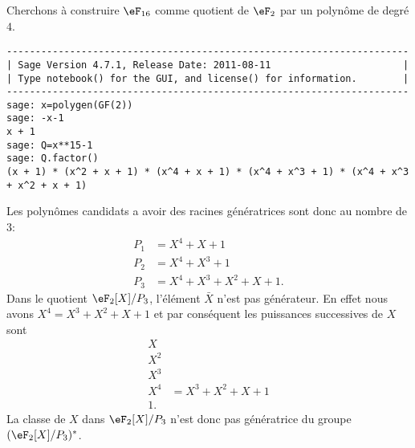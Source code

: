 \begin{example}     \label{ExemWUdrcs}
    Cherchons à construire \( \eF_{16}\) comme quotient de \( \eF_2\) par un polynôme de degré \( 4\).
    \begin{verbatim}
----------------------------------------------------------------------
| Sage Version 4.7.1, Release Date: 2011-08-11                       |
| Type notebook() for the GUI, and license() for information.        |
----------------------------------------------------------------------
sage: x=polygen(GF(2))
sage: -x-1
x + 1
sage: Q=x**15-1
sage: Q.factor()
(x + 1) * (x^2 + x + 1) * (x^4 + x + 1) * (x^4 + x^3 + 1) * (x^4 + x^3 + x^2 + x + 1)
    \end{verbatim}
    Les polynômes candidats a avoir des racines génératrices sont donc au nombre de \( 3\):
    \begin{subequations}
        \begin{align}
            P_1&=X^4+X+1\\
            P_2&=X^4+X^3+1\\
            P_3&=X^4+X^3+X^2+X+1.
        \end{align}
    \end{subequations}
    Dans le quotient \( \eF_2[X]/P_3\), l'élément \( \bar X\) n'est pas générateur. En effet nous avons \( X^4=X^3+X^2+X+1\) et par conséquent les puissances successives de \( X\) sont
    \begin{subequations}
        \begin{align}
            X&\\
            X^2&\\
            X^3&\\
            X^4&=X^3+X^2+X+1\\
            1.
        \end{align}
    \end{subequations}
    La classe de \( X\) dans \( \eF_2[X]/P_3\) n'est donc pas génératrice du groupe \( (\eF_2[X]/P_3)^*\).


\end{example}
